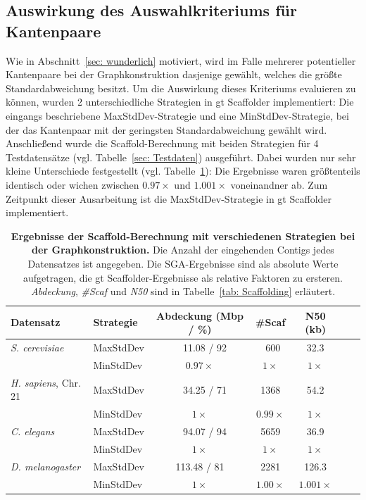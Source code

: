 \documentclass[a4paper,11pt,parskip]{scrartcl}
\begin{document}
\subsection{Auswirkung des Auswahlkriteriums für Kantenpaare}
\label{sec: wunderlich_assert}
Wie in Abschnitt~\ref{sec: wunderlich} motiviert, wird im Falle mehrerer
potentieller Kantenpaare bei der Graphkonstruktion dasjenige gewählt, welches
die größte Standardabweichung besitzt. Um die Auswirkung dieses
Kriteriums evaluieren zu können, wurden 2 unterschiedliche Strategien in gt
Scaffolder implementiert: Die eingangs beschriebene MaxStdDev-Strategie und eine
MinStdDev-Strategie, bei der das Kantenpaar mit der geringsten
Standardabweichung gewählt wird. Anschließend wurde die Scaffold-Berechnung mit
beiden Strategien für 4 Testdatensätze (vgl. Tabelle~\ref{sec: Testdaten})
ausgeführt. Dabei wurden nur sehr kleine Unterschiede festgestellt (vgl.
Tabelle~\ref{tab: stddev}): Die Ergebnisse waren größtenteils identisch oder
wichen zwischen $0.97\times$ und $1.001\times$ voneinandner ab. Zum Zeitpunkt
dieser Ausarbeitung ist die MaxStdDev-Strategie in gt Scaffolder implementiert.

\begin{table}
  \begin{tabular}{llccccc}
    \toprule
    Datensatz & Strategie & Abdeckung (Mbp / \%) & \#Scaf & N50 (kb)\\
    \midrule
    \textit{S. cerevisiae}
    & MaxStdDev  & ~~11.08 / 92  &      ~600   &  32.3      \\
    & MinStdDev  & $0.97\times$     &  $1\times$  & $1\times$    \\
    \midrule
    \textit{H. sapiens}, Chr. 21
    & MaxStdDev  & ~~34.25 / 71  &      1368   &  54.2      \\
    & MinStdDev  & $1\times$     &  $0.99\times$  & $1\times$    \\
    \midrule
    \textit{C. elegans}
    & MaxStdDev  & ~~94.07 / 94  &      5659   &  36.9      \\
    & MinStdDev  & $1\times$     &  $1\times$  & $1\times$    \\
    \midrule
    \textit{D. melanogaster}
    & MaxStdDev  & 113.48 / 81   &      2281   &  126.3     \\
    & MinStdDev  & $1\times$     &  $1.00\times$  & $1.001\times$    \\
    \bottomrule
  \end{tabular}
  \caption{\label{tab: stddev}\textbf{Ergebnisse der Scaffold-Berechnung mit
  verschiedenen Strategien bei der Graphkonstruktion.}
  Die Anzahl der eingehenden Contigs jedes Datensatzes ist angegeben. Die
  SGA-Ergebnisse sind als absolute Werte aufgetragen, die gt
  Scaffolder-Ergebnisse als relative Faktoren zu ersteren.
  \textit{Abdeckung}, \textit{\#Scaf} und \textit{N50} sind in
  Tabelle~\ref{tab: Scaffolding} erläutert.}
\end{table}
\end{document}

